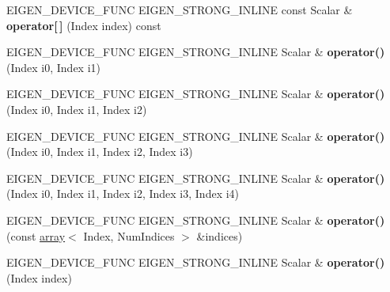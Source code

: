 \begin{DoxyCompactItemize}
E\+I\+G\+E\+N\+\_\+\+D\+E\+V\+I\+C\+E\+\_\+\+F\+U\+NC E\+I\+G\+E\+N\+\_\+\+S\+T\+R\+O\+N\+G\+\_\+\+I\+N\+L\+I\+NE const Scalar \& {\bfseries operator\mbox{[}$\,$\mbox{]}} (Index index) const
\item 
\mbox{\label{class_eigen_1_1_tensor_a627a817dab4f05c53deea8854cd68af6}} 
E\+I\+G\+E\+N\+\_\+\+D\+E\+V\+I\+C\+E\+\_\+\+F\+U\+NC E\+I\+G\+E\+N\+\_\+\+S\+T\+R\+O\+N\+G\+\_\+\+I\+N\+L\+I\+NE Scalar \& {\bfseries operator()} (Index i0, Index i1)
\item 
\mbox{\label{class_eigen_1_1_tensor_a6b7933eae10efb4c040e2ba9178a1dec}} 
E\+I\+G\+E\+N\+\_\+\+D\+E\+V\+I\+C\+E\+\_\+\+F\+U\+NC E\+I\+G\+E\+N\+\_\+\+S\+T\+R\+O\+N\+G\+\_\+\+I\+N\+L\+I\+NE Scalar \& {\bfseries operator()} (Index i0, Index i1, Index i2)
\item 
\mbox{\label{class_eigen_1_1_tensor_a33b1b8d83c3e38ac67bd0eb4f93d5a01}} 
E\+I\+G\+E\+N\+\_\+\+D\+E\+V\+I\+C\+E\+\_\+\+F\+U\+NC E\+I\+G\+E\+N\+\_\+\+S\+T\+R\+O\+N\+G\+\_\+\+I\+N\+L\+I\+NE Scalar \& {\bfseries operator()} (Index i0, Index i1, Index i2, Index i3)
\item 
\mbox{\label{class_eigen_1_1_tensor_a5fb4688bcb63a278563e92368d063de7}} 
E\+I\+G\+E\+N\+\_\+\+D\+E\+V\+I\+C\+E\+\_\+\+F\+U\+NC E\+I\+G\+E\+N\+\_\+\+S\+T\+R\+O\+N\+G\+\_\+\+I\+N\+L\+I\+NE Scalar \& {\bfseries operator()} (Index i0, Index i1, Index i2, Index i3, Index i4)
\item 
\mbox{\label{class_eigen_1_1_tensor_a0bcabcda03b8acd8a7be6b639e95a7d4}} 
E\+I\+G\+E\+N\+\_\+\+D\+E\+V\+I\+C\+E\+\_\+\+F\+U\+NC E\+I\+G\+E\+N\+\_\+\+S\+T\+R\+O\+N\+G\+\_\+\+I\+N\+L\+I\+NE Scalar \& {\bfseries operator()} (const \hyperlink{class_eigen_1_1array}{array}$<$ Index, Num\+Indices $>$ \&indices)
\item 
\mbox{\label{class_eigen_1_1_tensor_ab70ba0dba7198318e91a2cc09e2c7c35}} 
E\+I\+G\+E\+N\+\_\+\+D\+E\+V\+I\+C\+E\+\_\+\+F\+U\+NC E\+I\+G\+E\+N\+\_\+\+S\+T\+R\+O\+N\+G\+\_\+\+I\+N\+L\+I\+NE Scalar \& {\bfseries operator()} (Index index)
\item 
\mbox{\label{class_eigen_1_1_tensor_a2f2a549d0c385bb22fde021360eaa092}} 

\end{DoxyCompactItemize}
